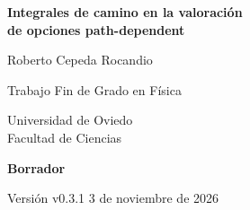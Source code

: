 \documentclass[11pt,a4paper,oneside]{report}
\newcommand{\versionborrador}{v0.3.1}
\newcommand{\fechaborrador}{3 de noviembre de 2026}
\begin{document}
\begin{titlepage}
\centering
\vspace*{2cm}
{\LARGE\bfseries Integrales de camino en la valoración\\[0.3cm]
de opciones path-dependent\par}
\vspace{1.5cm}
{\Large Roberto Cepeda Rocandio\par}
\vspace{2.5cm}
{\large Trabajo Fin de Grado en Física\par}
\vspace{0.4cm}
{\sc Universidad de Oviedo}\\[0.2cm]
Facultad de Ciencias
\vfill
{\large\bfseries Borrador\par}
\vspace{0.3cm}
Versión \versionborrador{} \textperiodcentered{} \fechaborrador\par
\end{titlepage}

\clearpage
{}
\tableofcontents

\clearpage
{}
\setcounter{page}{1}










\clearpage

\end{document}
